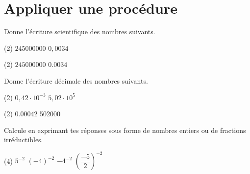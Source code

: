 \documentclass[a4paper, 12pt, parskip=half-, twoside=semi]{scrartcl}
\begin{document}
\section*{ Appliquer une procédure}
\begin{appliquer}[points=1]
    Donne l'écriture scientifique des nombres suivants.\begin{tasks}(2)
        \task $\num{245000000}$
        \task $0,0034$
    \end{tasks}
\end{appliquer}
\begin{solappliquer}
    \begin{tasks}(2)
        \task \(\num[scientific-notation=true,round-mode = figures]{245000000}\)
        \task \(\num[scientific-notation=true,round-mode = figures]{0,0034}\)
    \end{tasks}
\end{solappliquer}
\begin{appliquer}[points=1]
    Donne l'écriture décimale des nombres suivants.
    \begin{tasks}(2)
        \task $0,42 \cdot 10^{-3}$
        \task $5,02 \cdot 10^{5}$
    \end{tasks}
\end{appliquer}
\begin{solappliquer}
    \begin{tasks}(2)
        \task \num{0.00042}
        \task \num{502000} 
    \end{tasks}
\end{solappliquer}
\begin{appliquer}[points=2]
    Calcule en exprimant tes réponses sous forme de nombres entiers ou de fractions irréductibles.
    \begin{tasks}(4)
        \task \(5^{-2}\)
        \task \(\left(-4\right)^{-2}\)
        \task \(- 4^{- 2}\)
        \task \(\left( \dfrac{- 5}{2} \right)^{- 2}\)
    \end{tasks}
\end{appliquer}
\end{document}
